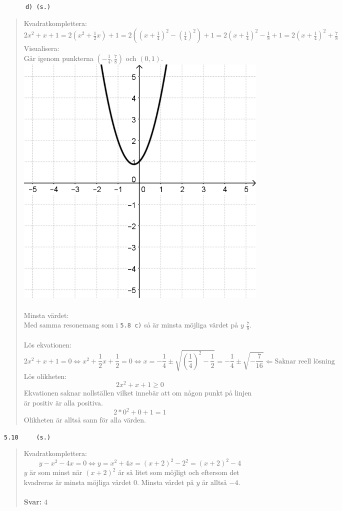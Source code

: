 \documentclass[a4paper]{article}
\newcommand{\tskcol}[1]{\textcolor{tskcol}{#1}}
\begin{document}
	\pagebreak
	\texttt{\tskcol{~~~~~~d) (s.)}}
	\begin{quotation}
		\noindent
		Kvadratkomplettera:
		\[2x^2+x+1=2(x^2+\tfrac{1}{2}x)+1=
		2((x+\tfrac{1}{4})^2-(\tfrac{1}{4})^2)+1=
		2(x+\tfrac{1}{4})^2-\tfrac{1}{8}+1=
		2(x+\tfrac{1}{4})^2+\tfrac{7}{8}\]
		Visualisera: \\
		Går igenom punkterna $(-\frac{1}{4},\frac{7}{8})$ och $(0,1)$. \\
		\includegraphics[scale=0.2]{images/59d.png} \\ \\
		Minsta värdet: \\
		Med samma resonemang som i \texttt{\tskcol{5.8 c)}} så är minsta möjliga värdet på $y$ $\frac{7}{8}$. \\ \\
		Lös ekvationen:
		\[2x^2+x+1=0 \Leftrightarrow
		x^2+\frac{1}{2}x+\frac{1}{2}=0 \Leftrightarrow
		x=-\frac{1}{4}\pm\sqrt{(\frac{1}{4})^2-\frac{1}{2}}=-\frac{1}{4}\pm\sqrt{-\frac{7}{16}} \Leftarrow 
		\text{Saknar reell lösning}\]
		Lös olikheten:
		\[2x^2+x+1\ge0\]
		Ekvationen saknar nollställen vilket innebär att om någon punkt på linjen är positiv är alla positiva.
		\[2*0^2+0+1=1\]
		Olikheten är alltså sann för alla värden.
	\end{quotation}
	
	\texttt{\tskcol{5.10~~~~ (s.)}}
	\begin{quotation}
		\noindent
		Kvadratkomplettera:
		\[y-x^2-4x=0 \Leftrightarrow 
		y=x^2+4x=(x+2)^2-2^2=(x+2)^2-4\]
		$y$ är som minst när $(x+2)^2$ är så litet som möjligt och eftersom det kvadreras är minsta möjliga värdet 0. Minsta värdet på $y$ är alltså $-4$. 
		\\ \\
		\textbf{Svar:} $4$
	\end{quotation}
	
\end{document}
